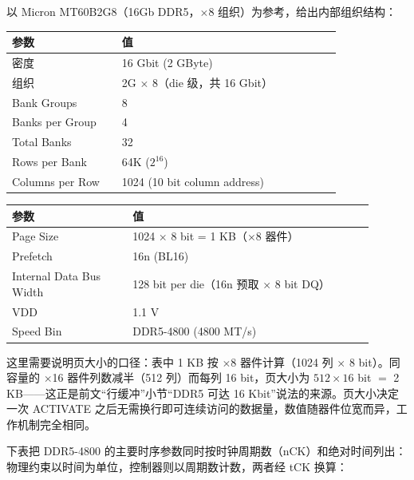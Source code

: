 
以 Micron MT60B2G8（16Gb DDR5，$\times$8 组织）为参考，给出内部组织结构：

\begin{longtable}{L{0.3\linewidth}L{0.6\linewidth}}
\toprule
参数 & 值 \\
\midrule
密度 & 16 Gbit (2 GByte) \\\tablerowrule
组织 & 2G $\times$ 8（die 级，共 16 Gbit） \\\tablerowrule
Bank Groups & 8 \\\tablerowrule
Banks per Group & 4 \\\tablerowrule
Total Banks & 32 \\\tablerowrule
Rows per Bank & 64K ($2^{16}$) \\\tablerowrule
Columns per Row & 1024 (10 bit column address) \\
\bottomrule
\end{longtable}

\begin{longtable}{L{0.3\linewidth}L{0.6\linewidth}}
\toprule
参数 & 值 \\
\midrule
Page Size & 1024 $\times$ 8 bit = 1 KB（$\times$8 器件） \\\tablerowrule
Prefetch & 16n (BL16) \\\tablerowrule
Internal Data Bus Width & 128 bit per die（16n 预取 $\times$ 8 bit DQ） \\\tablerowrule
VDD & 1.1 V \\\tablerowrule
Speed Bin & DDR5-4800 (4800 MT/s) \\
\bottomrule
\end{longtable}

这里需要说明页大小的口径：表中 1 KB 按 $\times$8 器件计算（1024 列 $\times$ 8 bit）。同容量的 $\times$16 器件列数减半（512 列）而每列 16 bit，页大小为 $512 \times 16$ bit $=$ 2 KB——这正是前文“行缓冲”小节“DDR5 可达 16 Kbit”说法的来源。页大小决定一次 ACTIVATE 之后无需换行即可连续访问的数据量，数值随器件位宽而异，工作机制完全相同。


下表把 DDR5-4800 的主要时序参数同时按时钟周期数（nCK）和绝对时间列出：物理约束以时间为单位，控制器则以周期数计数，两者经 tCK 换算：


